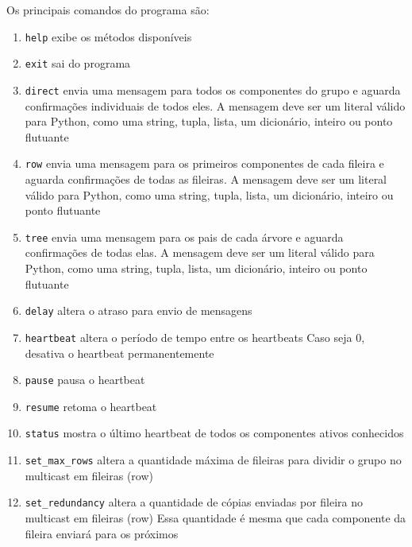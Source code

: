 \documentclass[12pt,twocolumn]{article}
\begin{document}
			Os principais comandos do programa são: 
			\begin{enumerate}
				\item \texttt{help} exibe os métodos disponíveis
				
				\item \texttt{exit} sai do programa
				
				\item \texttt{direct} envia uma mensagem para todos os componentes do grupo e aguarda confirmações individuais de todos eles.
				A mensagem deve ser um literal válido para Python, como uma string, tupla, lista, um dicionário, inteiro ou ponto flutuante
				
				\item \texttt{row} envia uma mensagem para os primeiros componentes de cada fileira e aguarda confirmações de todas as fileiras.
				A mensagem deve ser um literal válido para Python, como uma string, tupla, lista, um dicionário, inteiro ou ponto flutuante
				
				\item \texttt{tree} envia uma mensagem para os pais de cada árvore e aguarda confirmações de todas elas.
				A mensagem deve ser um literal válido para Python, como uma string, tupla, lista, um dicionário, inteiro ou ponto flutuante
				
				\item \texttt{delay} altera o atraso para envio de mensagens
				
				\item \texttt{heartbeat} altera o período de tempo entre os heartbeats
				Caso seja 0, desativa o heartbeat permanentemente
				
				\item \texttt{pause}  pausa o heartbeat
				
				\item \texttt{resume}  retoma o heartbeat 
				
				\item \texttt{status}  mostra o último heartbeat de todos os componentes ativos conhecidos 
				
				\item \texttt{set\_max\_rows}  altera a quantidade máxima de fileiras para dividir o grupo no multicast em fileiras (row)
				
				\item \texttt{set\_redundancy}  altera a quantidade de cópias enviadas por fileira no multicast em fileiras (row)
				Essa quantidade é mesma que cada componente da fileira enviará para os próximos 								
				
			\end{enumerate}
			
				
\end{document}
